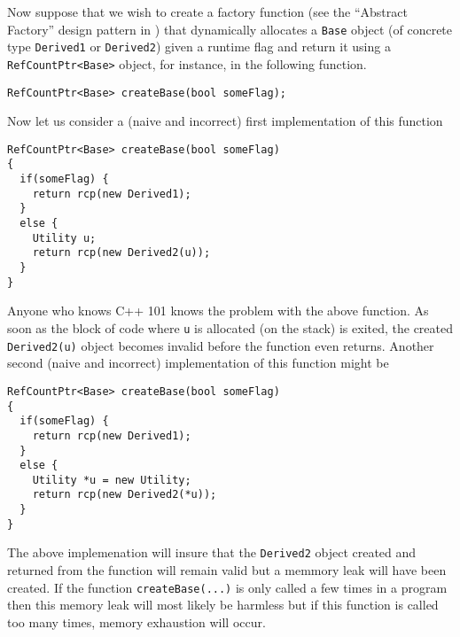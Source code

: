 Now suppose that we wish to create a factory function (see the
``Abstract Factory'' design pattern in {}\cite{ref:gama_et_al_1995})
that dynamically allocates a {}\texttt{Base} object (of concrete type
{}\texttt{Derived1} or {}\texttt{Derived2}) given a runtime flag and
return it using a {}\texttt{RefCountPtr<Base>} object, for instance,
in the following function.
%
{\scriptsize\begin{verbatim}
RefCountPtr<Base> createBase(bool someFlag);
\end{verbatim}}
%
Now let us consider a (naive and incorrect) first implementation of
this function
%
{\scriptsize\begin{verbatim}
RefCountPtr<Base> createBase(bool someFlag)
{
  if(someFlag) {
    return rcp(new Derived1);
  }
  else {
    Utility u;
    return rcp(new Derived2(u));
  }
}
\end{verbatim}}
%
\noindent{}
Anyone who knows C++ 101 knows the problem with the above function.
As soon as the block of code where {}\texttt{u} is allocated (on the
stack) is exited, the created {}\texttt{Derived2(u)} object becomes
invalid before the function even returns.  Another second (naive and
incorrect) implementation of this function might be
%
{\scriptsize\begin{verbatim}
RefCountPtr<Base> createBase(bool someFlag)
{
  if(someFlag) {
    return rcp(new Derived1);
  }
  else {
    Utility *u = new Utility;
    return rcp(new Derived2(*u));
  }
}
\end{verbatim}}
%
\noindent{}
The above implemenation will insure that the {}\texttt{Derived2} object
created and returned from the function will remain valid but a memmory
leak will have been created.  If the function {}\texttt{create\-Base(...)}
is only called a few times in a program then this memory leak will
most likely be harmless but if this function is called too many times,
memory exhaustion will occur.

